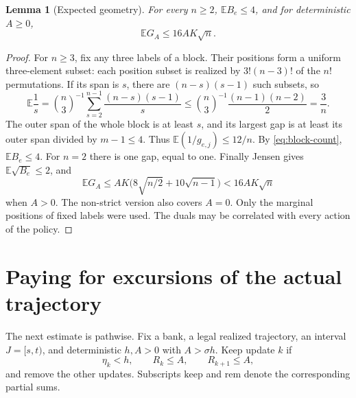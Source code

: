 \documentclass[11pt]{article}
\newtheorem{lemma}[theorem]{Lemma}
\theoremstyle{remark}
\newcommand{\E}{\mathbb E}
\begin{document}
\begin{lemma}[Expected geometry]\label{lem:geometry}
For every $n\ge2$, $\E B_e\le4$, and for deterministic $A\ge0$,
\begin{equation}\label{eq:meanG}
 \E G_A\le16AK\sqrt n.
\end{equation}
\end{lemma}
\begin{proof}
For $n\ge3$, fix any three labels of a block. Their positions form
a uniform three-element subset: each position subset is realized by
$3!(n-3)!$ of the $n!$ permutations. If its span is $s$, there are
$(n-s)(s-1)$ such subsets, so
\[
 \E\frac1s
 =\binom{n}{3}^{-1}\sum_{s=2}^{n-1}\frac{(n-s)(s-1)}s
 \le\binom{n}{3}^{-1}\frac{(n-1)(n-2)}2=\frac3n.
\]
The outer span of the whole block is at least $s$, and its largest
gap is at least its outer span divided by $m-1\le4$. Thus
$\E(1/g_{e,j})\le12/n$. By \eqref{eq:block-count},
$\E B_e\le4$. For $n=2$ there is one gap, equal to one.
Finally Jensen gives $\E\sqrt{B_e}\le2$, and
\[
 \E G_A\le AK\bigl(8\sqrt{n/2}+10\sqrt{n-1}\bigr)
 <16AK\sqrt n
\]
when $A>0$. The non-strict version also covers $A=0$.
Only the marginal positions of fixed labels were used. The duals may
be correlated with every action of the policy.
\end{proof}

\section{Paying for excursions of the actual trajectory}

The next estimate is pathwise. Fix a bank, a legal realized trajectory,
an interval $J=[s,t)$, and deterministic $h,A>0$ with $A>\sigma h$.
Keep update $k$ if
\begin{equation}\label{eq:keep}
 \eta_k<h,\qquad R_k\le A,\qquad R_{k+1}\le A,
\end{equation}
and remove the other updates. Subscripts $\mathrm{keep}$ and
$\mathrm{rem}$ denote the corresponding partial sums.
\end{document}
